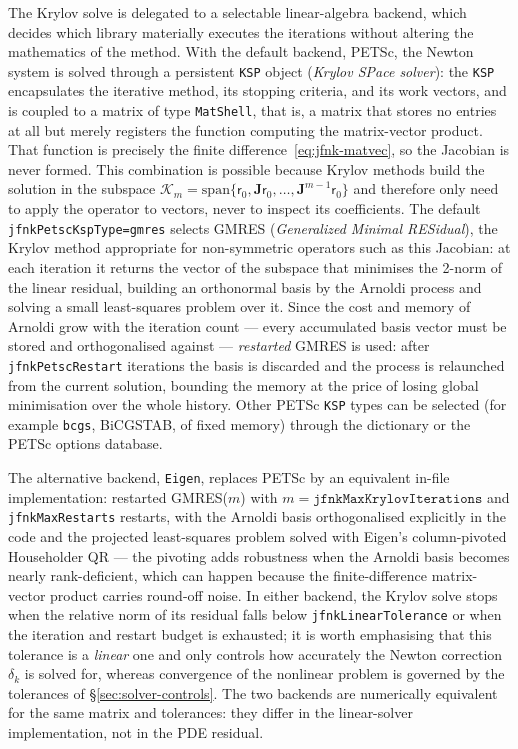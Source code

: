\documentclass[11pt,a4paper]{article}
\newcommand{\code}[1]{\texttt{\small #1}}
\begin{document}
The Krylov solve is delegated to a selectable linear-algebra backend, which
decides which library materially executes the iterations without altering the
mathematics of the method. With the default backend, PETSc, the Newton system is
solved through a persistent \code{KSP} object (\emph{Krylov SPace solver}): the
\code{KSP} encapsulates the iterative method, its stopping criteria, and its
work vectors, and is coupled to a matrix of type \code{MatShell}, that is, a
matrix that stores no entries at all but merely registers the function
computing the matrix-vector product. That function is precisely the finite
difference~\eqref{eq:jfnk-matvec}, so the Jacobian is never formed. This
combination is possible because Krylov methods build the solution in the
subspace
$\mathcal{K}_m=\mathrm{span}\{\mathsf{r}_0,\mathbf{J}\mathsf{r}_0,\ldots,
\mathbf{J}^{m-1}\mathsf{r}_0\}$ and therefore only need to apply the operator to
vectors, never to inspect its coefficients. The default
\code{jfnkPetscKspType=gmres} selects GMRES (\emph{Generalized Minimal
RESidual}), the Krylov method appropriate for non-symmetric operators such as
this Jacobian: at each iteration it returns the vector of the subspace that
minimises the 2-norm of the linear residual, building an orthonormal basis by
the Arnoldi process and solving a small least-squares problem over it. Since
the cost and memory of Arnoldi grow with the iteration count --- every
accumulated basis vector must be stored and orthogonalised against ---
\emph{restarted} GMRES is used: after \code{jfnkPetscRestart} iterations the
basis is discarded and the process is relaunched from the current solution,
bounding the memory at the price of losing global minimisation over the whole
history. Other PETSc \code{KSP} types can be selected (for example \code{bcgs},
BiCGSTAB, of fixed memory) through the dictionary or the PETSc options database.

The alternative backend, \code{Eigen}, replaces PETSc by an equivalent in-file
implementation: restarted GMRES($m$) with $m=\texttt{jfnkMaxKrylovIterations}$
and \code{jfnkMaxRestarts} restarts, with the Arnoldi basis orthogonalised
explicitly in the code and the projected least-squares problem solved with
Eigen's column-pivoted Householder QR --- the pivoting adds robustness when the
Arnoldi basis becomes nearly rank-deficient, which can happen because the
finite-difference matrix-vector product carries round-off noise. In either
backend, the Krylov solve stops when the relative norm of its residual falls
below \code{jfnkLinearTolerance} or when the iteration and restart budget is
exhausted; it is worth emphasising that this tolerance is a \emph{linear} one
and only controls how accurately the Newton correction $\delta_k$ is solved for,
whereas convergence of the nonlinear problem is governed by the tolerances of
\S\ref{sec:solver-controls}. The two backends are numerically equivalent for the
same matrix and tolerances: they differ in the linear-solver implementation, not
in the PDE residual.
\end{document}
